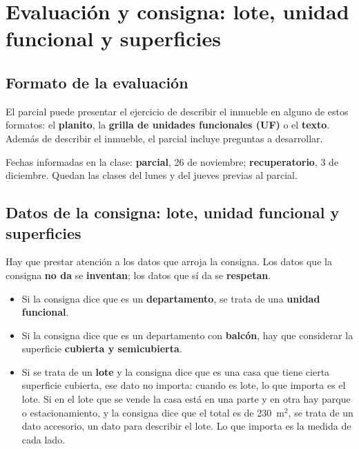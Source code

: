 \documentclass[12pt,oneside]{book}
\begin{document}
\chapter[Evaluación y consigna]{Evaluación y consigna: lote, unidad funcional y superficies}

\section{Formato de la evaluación}

El parcial puede presentar el ejercicio de describir el inmueble en alguno de estos formatos: el \textbf{planito}, la \textbf{grilla de unidades funcionales (UF)} o el \textbf{texto}. Además de describir el inmueble, el parcial incluye preguntas a desarrollar.

\begin{note}
Fechas informadas en la clase: \textbf{parcial}, 26 de noviembre; \textbf{recuperatorio}, 3 de diciembre. Quedan las clases del lunes y del jueves previas al parcial.
\end{note}

\section{Datos de la consigna: lote, unidad funcional y superficies}

Hay que prestar atención a los datos que arroja la consigna. Los datos que la consigna \textbf{no da} se \textbf{inventan}; los datos que sí da se \textbf{respetan}.

\begin{itemize}
    \item Si la consigna dice que es un \textbf{departamento}, se trata de una \textbf{unidad funcional}.
    \item Si la consigna dice que es un departamento con \textbf{balcón}, hay que considerar la superficie \textbf{cubierta y semicubierta}.
    \item Si se trata de un \textbf{lote} y la consigna dice que es una casa que tiene cierta superficie cubierta, ese dato no importa: cuando es lote, lo que importa es el lote. Si en el lote que se vende la casa está en una parte y en otra hay parque o estacionamiento, y la consigna dice que el total es de 230~m$^2$, se trata de un dato accesorio, un dato para describir el lote. Lo que importa es la medida de cada lado.
\end{itemize}
\end{document}
